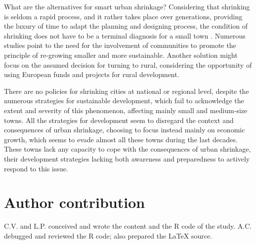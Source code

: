 What are the alternatives for smart urban shrinkage? Considering that shrinking is seldom a rapid process, and it rather takes place over generations, providing the luxury of time to adapt the planning and designing process, the condition of shrinking does not have to be a terminal diagnosis for a small town \citep{fugate_shrinking_2007}. Numerous studies point to the need for the involvement of communities to promote the principle of re-growing smaller and more sustainable. Another solution might focus on the assumed decision for turning to rural, considering the opportunity of using European funds and projects for rural development.

There are no policies for shrinking cities at national or regional level, despite the numerous strategies for sustainable development, which fail to acknowledge the extent and severity of this phenomenon, affecting mainly small and medium-size towns. All the strategies for development seem to disregard the context and consequences of urban shrinkage, choosing to focus instead mainly on economic growth, which seems to evade almost all these towns during the last decades. These towns lack any capacity to cope with the consequences of urban shrinkage, their development strategies lacking both awareness and preparedness to actively respond to this issue.

\section{Author contribution}

C.V. and L.P. conceived and wrote the content and the R code of the study. A.C. debugged and reviewed the R code; also prepared the LaTeX source.



\address{Cristiana Vîlcea\\
	University of Craiova\\
	Faculty of Sciences\\
	Department of Geography\\
	13 Al. I. Cuza Street, Craiova\\
	Romania\\
	}

\address{Liliana Popescu\\
	University of Craiova\\
	Faculty of Sciences\\
	Department of Geography\\
	13 Al. I. Cuza Street, Craiova\\
	Romania\\
	\\
	\textit{corresponding author}}

\address{Alin Clincea\\
	University of Craiova\\
	Faculty of Sciences\\
	Department of Informatics\\
	13 Al. I. Cuza Street, Craiova\\
	Romania\\
	}
